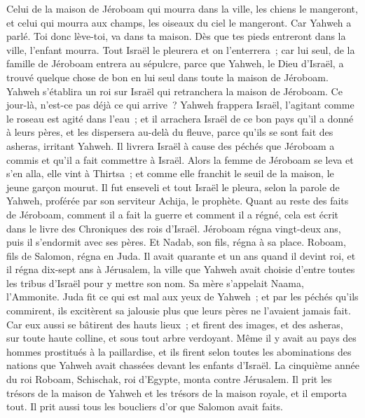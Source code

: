 \begin{multicols}{2}
Celui de la maison de Jéroboam qui mourra dans la ville, les chiens le mangeront, et celui qui mourra aux champs, les oiseaux du ciel le mangeront. Car Yahweh a parlé.
Toi donc lève-toi, va dans ta maison. Dès que tes pieds entreront dans la ville, l'enfant mourra.
Tout Israël le pleurera et on l'enterrera~; car lui seul, de la famille de Jéroboam entrera au sépulcre, parce que Yahweh, le Dieu d'Israël, a trouvé quelque chose de bon en lui seul dans toute la maison de Jéroboam.
Yahweh s'établira un roi sur Israël qui retranchera la maison de Jéroboam. Ce jour-là, n'est-ce pas déjà ce qui arrive~?
Yahweh frappera Israël, l'agitant comme le roseau est agité dans l'eau~; et il arrachera Israël de ce bon pays qu'il a donné à leurs pères, et les dispersera au-delà du fleuve, parce qu'ils se sont fait des asheras, irritant Yahweh.
Il livrera Israël à cause des péchés que Jéroboam a commis et qu'il a fait commettre à Israël.
Alors la femme de Jéroboam se leva et s'en alla, elle vint à Thirtsa~; et comme elle franchit le seuil de la maison, le jeune garçon mourut.
Il fut enseveli et tout Israël le pleura, selon la parole de Yahweh, proférée par son serviteur Achija, le prophète.
Quant au reste des faits de Jéroboam, comment il a fait la guerre et comment il a régné, cela est écrit dans le livre des Chroniques des rois d'Israël.
Jéroboam régna vingt-deux ans, puis il s'endormit avec ses pères. Et Nadab, son fils, régna à sa place.
Roboam, fils de Salomon, régna en Juda. Il avait quarante et un ans quand il devint roi, et il régna dix-sept ans à Jérusalem, la ville que Yahweh avait choisie d'entre toutes les tribus d'Israël pour y mettre son nom. Sa mère s'appelait Naama, l'Ammonite.
Juda fit ce qui est mal aux yeux de Yahweh~; et par les péchés qu'ils commirent, ils excitèrent sa jalousie plus que leurs pères ne l'avaient jamais fait.
Car eux aussi se bâtirent des hauts lieux~; et firent des images, et des asheras, sur toute haute colline, et sous tout arbre verdoyant. 
Même il y avait au pays des hommes prostitués à la paillardise, et ils firent selon toutes les abominations des nations que Yahweh avait chassées devant les enfants d'Israël. 
La cinquième année du roi Roboam, Schischak, roi d'Egypte, monta contre Jérusalem.
Il prit les trésors de la maison de Yahweh et les trésors de la maison royale, et il emporta tout. Il prit aussi tous les boucliers d'or que Salomon avait faits.

\end{multicols}

